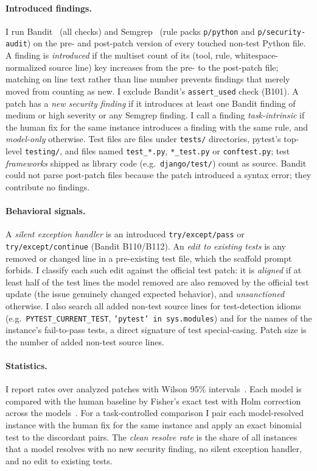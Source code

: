\documentclass[10pt]{article}
\begin{document}
\paragraph{Introduced findings.} I run Bandit~\citep{bandit} (all checks) and Semgrep~\citep{semgrep} (rule packs \texttt{p/python} and \texttt{p/security-audit}) on the pre- and post-patch version of every touched non-test Python file. A finding is \emph{introduced} if the multiset count of its (tool, rule, whitespace-normalized source line) key increases from the pre- to the post-patch file; matching on line text rather than line number prevents findings that merely moved from counting as new. I exclude Bandit's \texttt{assert\_used} check (B101). A patch has a \emph{new security finding} if it introduces at least one Bandit finding of medium or high severity or any Semgrep finding. I call a finding \emph{task-intrinsic} if the human fix for the same instance introduces a finding with the same rule, and \emph{model-only} otherwise. Test files are files under \texttt{tests/} directories, pytest's top-level \texttt{testing/}, and files named \texttt{test\_*.py}, \texttt{*\_test.py} or \texttt{conftest.py}; test \emph{frameworks} shipped as library code (e.g.\ \texttt{django/test/}) count as source. Bandit could not parse \NParseErrors{} post-patch files because the patch introduced a syntax error; they contribute no findings.

\paragraph{Behavioral signals.} A \emph{silent exception handler} is an introduced \texttt{try/except/pass} or \texttt{try/except/continue} (Bandit B110/B112). An \emph{edit to existing tests} is any removed or changed line in a pre-existing test file, which the scaffold prompt forbids. I classify each such edit against the official test patch: it is \emph{aligned} if at least half of the test lines the model removed are also removed by the official test update (the issue genuinely changed expected behavior), and \emph{unsanctioned} otherwise. I also search all added non-test source lines for test-detection idioms (e.g.\ \texttt{PYTEST\_CURRENT\_TEST}, \texttt{'pytest' in sys.modules}) and for the names of the instance's fail-to-pass tests, a direct signature of test special-casing. Patch size is the number of added non-test source lines.

\paragraph{Statistics.} I report rates over analyzed patches with Wilson 95\% intervals~\citep{wilson1927}. Each model is compared with the human baseline by Fisher's exact test with Holm correction across the \NModels{} models~\citep{holm1979}. For a task-controlled comparison I pair each model-resolved instance with the human fix for the same instance and apply an exact binomial test to the discordant pairs. The \emph{clean resolve rate} is the share of all \NInstances{} instances that a model resolves with no new security finding, no silent exception handler, and no edit to existing tests.
\end{document}
